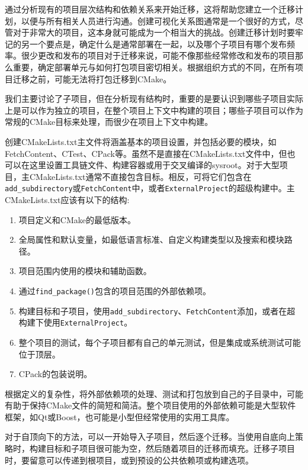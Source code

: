 通过分析现有的项目层次结构和依赖关系来开始迁移，这将帮助您建立一个迁移计划，以便与所有相关人员进行沟通。创建可视化关系图通常是一个很好的方式，尽管对于非常大的项目，这本身就可能成为一个相当大的挑战。创建迁移计划时要牢记的另一个要点是，确定什么是通常部署在一起，以及哪个子项目有哪个发布频率。很少更改和发布的项目对于迁移来说，可能不像那些经常修改和发布的项目那么重要，确定部署单元与如何打包项目密切相关。根据组织方式的不同，在所有项目迁移之前，可能无法将打包迁移到CMake。

我们主要讨论了子项目，但在分析现有结构时，重要的是要认识到哪些子项目实际上是可以作为独立的项目，在整个项目上下文中构建的项目；哪些子项目可以作为常规的CMake目标来处理，而很少在项目上下文中构建。

创建CMakeLists.txt主文件将涵盖基本的项目设置，并包括必要的模块，如FetchContent、CTest、CPack等。虽然不是直接在CMakeLists.txt文件中，但也可以在这里设置工具链文件、构建容器或用于交叉编译的sysroot。对于大型项目，主CMakeLists.txt通常不直接包含目标。相反，可将它们包含在\texttt{add\_subdirectory}或\texttt{FetchContent}中，或者\texttt{ExternalProject}的超级构建中。主CMakeLists.txt应该有以下的结构:

\begin{enumerate}
\item 
项目定义和CMake的最低版本。

\item
全局属性和默认变量，如最低语言标准、自定义构建类型以及搜索和模块路径。

\item
项目范围内使用的模块和辅助函数。

\item
通过\texttt{find\_package()}包含的项目范围的外部依赖项。

\item
构建目标和子项目，使用\texttt{add\_subdirectory}、\texttt{FetchContent}添加，或者在超构建下使用\texttt{ExternalProject}。

\item
整个项目的测试，每个子项目都有自己的单元测试，但是集成或系统测试可能位于顶层。

\item
CPack的包装说明。
\end{enumerate}

根据定义的复杂性，将外部依赖项的处理、测试和打包放到自己的子目录中，可能有助于保持CMake文件的简短和简洁。整个项目使用的外部依赖可能是大型软件框架，如Qt或Boost，也可能是小型但经常使用的实用工具库。

对于自顶向下的方法，可以一开始导入子项目，然后逐个迁移。当使用自底向上策略时，构建目标和子项目很可能为空，然后随着项目的迁移而填充。迁移子项目时，要留意可以传递到根项目，或到预设的公共依赖项或构建选项。

